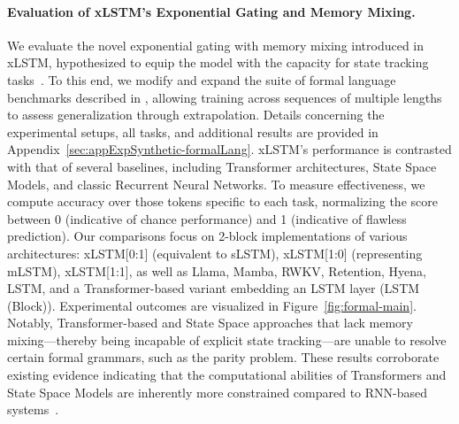 \paragraph{Evaluation of xLSTM’s Exponential Gating and Memory Mixing.} We evaluate the novel exponential gating with memory mixing introduced in xLSTM, hypothesized to equip the model with the capacity for state tracking tasks~\citep{Merrill:24, Merrill:23}. To this end, we modify and expand the suite of formal language benchmarks described in \citet{Deletang:23}, allowing training across sequences of multiple lengths to assess generalization through extrapolation. Details concerning the experimental setups, all tasks, and additional results are provided in Appendix~\ref{sec:appExpSynthetic-formalLang}. xLSTM's performance is contrasted with that of several baselines, including Transformer architectures, State Space Models, and classic Recurrent Neural Networks. To measure effectiveness, we compute accuracy over those tokens specific to each task, normalizing the score between 0 (indicative of chance performance) and 1 (indicative of flawless prediction). Our comparisons focus on 2-block implementations of various architectures: xLSTM[0:1] (equivalent to sLSTM), xLSTM[1:0] (representing mLSTM), xLSTM[1:1], as well as Llama, Mamba, RWKV, Retention, Hyena, LSTM, and a Transformer-based variant embedding an LSTM layer (LSTM (Block)). Experimental outcomes are visualized in Figure~\ref{fig:formal-main}. Notably, Transformer-based and State Space approaches that lack memory mixing—thereby being incapable of explicit state tracking—are unable to resolve certain formal grammars, such as the parity problem. These results corroborate existing evidence indicating that the computational abilities of Transformers and State Space Models are inherently more constrained compared to RNN-based systems~\citep{Merrill:24, Merrill:23, Deletang:23}.

